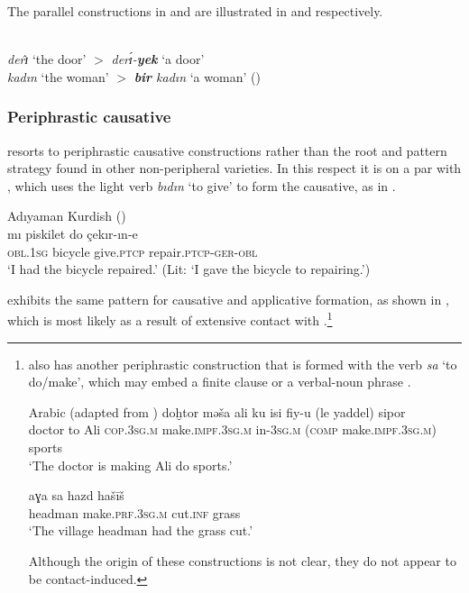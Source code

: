 \documentclass[output=paper]{langsci/langscibook}
\begin{document}
\noindent The parallel constructions in  and  are illustrated in  and  respectively.

\begin{exe}
\ex \label{defkr} \\	\textit{derɪ}̂ `the door' 	$>$ \textit{derɪ́-\textbf{yek}} `a door'
\ex \label{deftk} \\	\textit{kadın} `the woman' $>$ \textit{\textbf{bir} kadın} `a woman' ()
\end{exe}


\subsubsection{Periphrastic causative}

  resorts to {periphrastic causative} constructions rather than the {root and pattern} strategy found in other non-peripheral  varieties. In this respect it is on a par with , which uses the {light verb} \textit{bıdın} ‘to give’ to form the {causative}, as in .\largerpage

\begin{exe}
\ex \label{perrk}
{Adıyaman  Kurdish} (\citealt[62]{Atlamaz2012})\\
\gll  	mı         piskilet      	   do      	çekır-ın-e	\\
        \textsc{obl.1sg} bicycle  give.\textsc{ptcp}   repair.\textsc{ptcp-ger-obl}	 \\
        \glt `I had the bicycle repaired.' (Lit: `I gave the bicycle to repairing.')
\end{exe}

  exhibits the same pattern for {causative} and applicative {formation}, as shown in , which is most likely as a result of extensive contact with .\footnote{  also has another periphrastic construction that is formed with the verb \textit{sa} `to do/make', which may embed a finite clause  or a verbal-{noun phrase} .

\ea \label{make} { Arabic} (adapted from \citealt[221]{Taylan2017})
\ea
\label{makefin}  \gll doḫtor mə\v{s}a ali ku isi fiy-u (le yaddel) sipor \\
		doctor to Ali \textsc{cop.3sg.m} make.\textsc{impf.3sg.m} in-\textsc{3sg.m} (\textsc{comp} make.\textsc{impf.3sg.m}) sports\\\glt `The doctor is making Ali do sports.'

		\ex \label{makeinf} \gll aɣa sa hazd ha\v{s}ī\v{s}\\
		headman make.\textsc{prf.3sg.m} cut.\textsc{inf} grass  \\
		\glt 	`The village headman had the grass cut.'
\z
\z

\noindent Although the origin of these constructions is not clear, they do not appear to be contact-induced.}
\end{document}
